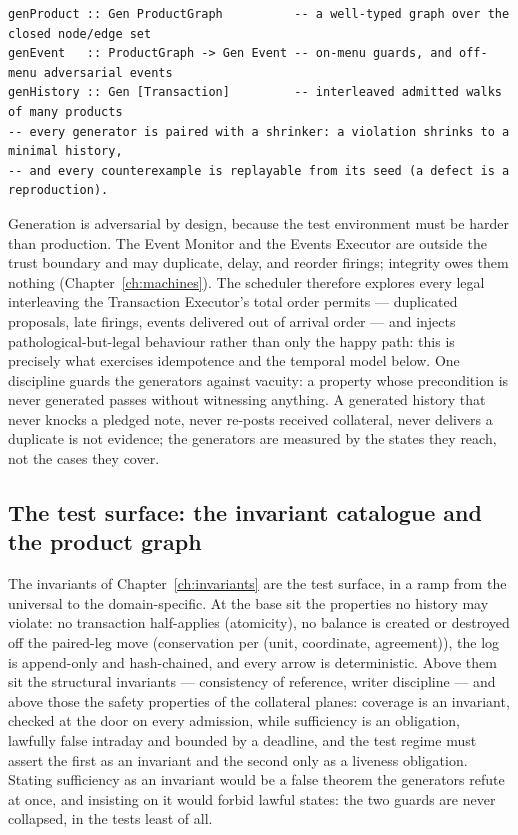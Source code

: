 \begin{lstlisting}
genProduct :: Gen ProductGraph          -- a well-typed graph over the closed node/edge set
genEvent   :: ProductGraph -> Gen Event -- on-menu guards, and off-menu adversarial events
genHistory :: Gen [Transaction]         -- interleaved admitted walks of many products
-- every generator is paired with a shrinker: a violation shrinks to a minimal history,
-- and every counterexample is replayable from its seed (a defect is a reproduction).
\end{lstlisting}

Generation is adversarial by design, because the test environment must be harder than
production. The Event Monitor and the Events Executor are outside the trust boundary and may
duplicate, delay, and reorder firings; integrity owes them nothing
(Chapter~\ref{ch:machines}). The scheduler therefore explores every legal interleaving the
Transaction Executor's total order permits --- duplicated proposals, late firings, events
delivered out of arrival order --- and injects pathological-but-legal behaviour rather than
only the happy path: this is precisely what exercises idempotence and the temporal model
below. One discipline guards the generators against vacuity: a property whose precondition
is never generated passes without witnessing anything. A generated history that never knocks
a pledged note, never re-posts received collateral, never delivers a duplicate is not
evidence; the generators are measured by the states they reach, not the cases they cover.

\subsection{The test surface: the invariant catalogue and the product graph}

The invariants of Chapter~\ref{ch:invariants} are the test surface, in a ramp from the
universal to the domain-specific. At the base sit the properties no history may violate: no
transaction half-applies (atomicity), no balance is created or destroyed off the paired-leg
move (conservation per (unit, coordinate, agreement)), the log is append-only and
hash-chained, and every arrow is deterministic. Above them sit the structural invariants --- consistency of
reference, writer discipline --- and above those the safety properties of the collateral
planes: coverage is an invariant, checked at the door on every admission, while sufficiency
is an obligation, lawfully false intraday and bounded by a deadline, and the test regime
must assert the first as an invariant and the second only as a liveness obligation. Stating
sufficiency as an invariant would be a false theorem the generators refute at once, and
insisting on it would forbid lawful states: the two guards are never collapsed, in the tests
least of all.


